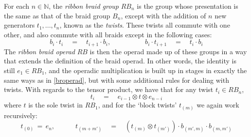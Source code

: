 \documentclass{amsbook} %
\numberwithin{section}{chapter}
\begin{document}
\begin{Defi} For each $n \in \mathbb{N}$, the \emph{ribbon braid group} $RB_{n}$ is the group whose presentation is the same as that of the braid group $B_{n}$, except with the addition of $n$ new generators $t_1, ..., t_n$, known as the \emph{twists}. These twists all commute with one other, and also commute with all braids except in the following cases:
\[ b_i \cdot t_i \quad = \quad t_{i+1} \cdot b_i, \quad \quad \quad \quad \quad b_i \cdot t_{i+1} \quad = \quad t_i \cdot b_i \]
The \emph{ribbon braid operad} $RB$ is then the operad made up of these groups in a way that extends the definition of the braid operad. In other words, the identity is still $e_1 \in RB_1$, and the operadic multiplication is built up in stages in exactly the same ways as in \cref{broperad}, but with some additional rules for dealing with twists. With regards to the tensor product, we have that for any twist $t_i \in RB_{n}$,
\[ t_i \quad = \quad e_{i-1} \otimes t \otimes e_{n-i} \]
where $t$ is the sole twist in $RB_1$, and for the `block twists' $t_{(m)}$ we again work recursively:
\[ t_{(0)} \, = \, e_n, \quad \quad \quad t_{(m+m')} \quad = \quad (t_{(m)} \otimes t_{(m')}) \cdot b_{(m', m)} \cdot b_{(m, m')} \]
\end{Defi}
\end{document}
